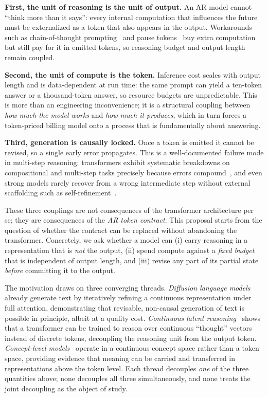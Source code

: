 \documentclass[11pt,a4paper]{article}
\begin{document}
\textbf{First, the unit of reasoning is the unit of output.} An AR model cannot ``think more than it says'': every internal computation that influences the future must be externalized as a token that also appears in the output. Workarounds such as chain-of-thought prompting~\cite{chain_of_thought} and pause tokens~\cite{pause_tokens} buy extra computation but still pay for it in emitted tokens, so reasoning budget and output length remain coupled.

\textbf{Second, the unit of compute is the token.} Inference cost scales with output length and is data-dependent at run time: the same prompt can yield a ten-token answer or a thousand-token answer, so resource budgets are unpredictable. This is more than an engineering inconvenience; it is a structural coupling between \emph{how much the model works} and \emph{how much it produces}, which in turn forces a token-priced billing model onto a process that is fundamentally about answering.

\textbf{Third, generation is causally locked.} Once a token is emitted it cannot be revised, so a single early error propagates. This is a well-documented failure mode in multi-step reasoning: transformers exhibit systematic breakdowns on compositional and multi-step tasks precisely because errors compound~\cite{faith_and_fate}, and even strong models rarely recover from a wrong intermediate step without external scaffolding such as self-refinement~\cite{self_refine}.

These three couplings are not consequences of the transformer architecture per se; they are consequences of the \emph{AR token contract}. This proposal starts from the question of whether the contract can be replaced without abandoning the transformer. Concretely, we ask whether a model can (i) carry reasoning in a representation that is \emph{not} the output, (ii) spend compute against a \emph{fixed budget} that is independent of output length, and (iii) revise any part of its partial state \emph{before} committing it to the output.

The motivation draws on three converging threads. \emph{Diffusion language models}~\cite{diffusion_lm,diffullm} already generate text by iteratively refining a continuous representation under full attention, demonstrating that revisable, non-causal generation of text is possible in principle, albeit at a quality cost. \emph{Continuous latent reasoning}~\cite{coconut} shows that a transformer can be trained to reason over continuous ``thought'' vectors instead of discrete tokens, decoupling the reasoning unit from the output token. \emph{Concept-level models}~\cite{lcm} operate in a continuous concept space rather than a token space, providing evidence that meaning can be carried and transferred in representations above the token level. Each thread decouples \emph{one} of the three quantities above; none decouples all three simultaneously, and none treats the joint decoupling as the object of study.
\end{document}
